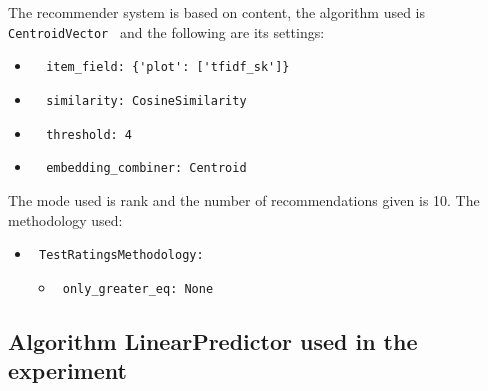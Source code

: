 \documentclass[11pt]{article}
\begin{document}
The recommender system is based on content, the algorithm used
is \verb| CentroidVector | and the following are its settings:
\begin{itemize}
 \item \begin{verbatim}
  item_field: {'plot': ['tfidf_sk']}
\end{verbatim}
 \item \begin{verbatim}
  similarity: CosineSimilarity
\end{verbatim}
 \item \begin{verbatim}
  threshold: 4
\end{verbatim}
 \item \begin{verbatim}
  embedding_combiner: Centroid
\end{verbatim}
\end{itemize}
\hfill\break
The mode used is rank and the number of recommendations given
is 10.
The methodology used:
\begin{itemize}
    \item \verb| TestRatingsMethodology:|
    \begin{itemize}
                    \item \verb| only_greater_eq: None |
            \end{itemize}
\end{itemize}
\hfill\break






\subsection{Algorithm LinearPredictor used in the experiment}\label{subsec:algo_LinearPredictor}
\end{document}
